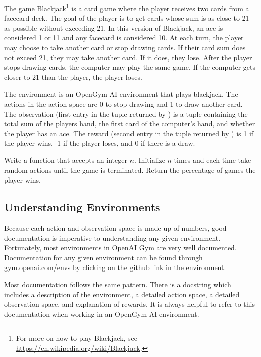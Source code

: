 \begin{problem}
The game Blackjack\footnote{For more on how to play Blackjack, see \url{https://en.wikipedia.org/wiki/Blackjack}.} is a card game where the player receives two cards from a facecard deck.
The goal of the player is to get cards whose sum is as close to 21 as possible without exceeding 21.
In this version of Blackjack, an ace is considered 1 or 11 and any facecard is considered 10.
At each turn, the player may choose to take another card or stop drawing cards.
If their card sum does not exceed 21, they may take another card.
If it does, they lose.
After the player stops drawing cards, the computer may play the same game.
If the computer gets closer to 21 than the player, the player loses.

The environment  is an OpenGym AI environment that plays blackjack.
The actions in the action space are 0 to stop drawing and 1 to draw another card.
The observation (first entry in the tuple returned by ) is a tuple containing the total sum of the players hand, the first card of the computer's hand, and whether the player has an ace.
The reward (second entry in the tuple returned by ) is 1 if the player wins, -1 if the player loses, and 0 if there is a draw.

Write a function  that accepts an integer $n$.
Initialize  $n$ times and each time take random actions until the game is terminated.
Return the percentage of games the player wins.
 
\label{prob:random-blackjack}
\end{problem}

\subsection*{Understanding Environments}

Because each action and observation space is made up of numbers, good documentation is imperative to understanding any given environment.
Fortunately, most environments in OpenAI Gym are very well documented.
Documentation for any given environment can be found through \url{gym.openai.com/envs} by clicking on the github link in the environment.

Most documentation follows the same pattern.
There is a docstring which includes a description of the environment, a detailed action space, a detailed observation space, and explanation of rewards.
It is always helpful to refer to this documentation when working in an OpenGym AI environment.

